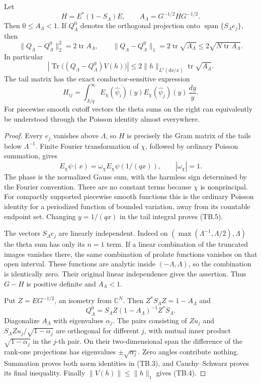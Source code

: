 \begin{proposition}
\label{AC-T22}
Let
\[
 H=E^*(1-S_\Lambda)E,\qquad
 A_\Lambda=G^{-1/2}HG^{-1/2}.
\]
Then \(0\leq A_\Lambda<1\).
If \(Q_\Lambda^0\) denotes the orthogonal projection onto
\(\operatorname{span}\{S_\Lambda e_j\}\), then
\[
 \|Q_\Lambda-Q_\Lambda^0\|_2^2
       =2\operatorname{tr}A_\Lambda,\qquad
 \|Q_\Lambda-Q_\Lambda^0\|_1
       =2\operatorname{tr}\sqrt{A_\Lambda}
       \leq2\sqrt{N\operatorname{tr}A_\Lambda}.
 \tag{TB.3}
\]
In particular
\[
 \left|\operatorname{Tr}\bigl((Q_\Lambda-Q_\Lambda^0)V(h)\bigr)\right|
       \leq 2\|h\|_{L^1(dx/x)}
                     \operatorname{tr}\sqrt{A_\Lambda}.
 \tag{TB.4}
\]
The tail matrix has the exact conductor-sensitive expression
\[
 H_{ij}=\int_{\Lambda/q}^\infty
   \overline{E_{\overline\chi}(\widehat\psi_i)(y)}
             E_{\overline\chi}(\widehat\psi_j)(y)\,\frac{dy}{y}.
 \tag{TB.5}
\]
For piecewise smooth cutoff vectors the theta sums on the
right can equivalently be understood through the Poisson
identity almost everywhere.
\end{proposition}
\begin{proof}
Every \(e_j\) vanishes above \(\Lambda\), so \(H\) is
precisely the Gram matrix of the tails below \(\Lambda^{-1}\).
Finite Fourier transformation of \(\chi\), followed by ordinary
Poisson summation, gives
\[
 E_\chi\psi(x)=\omega_\chi
       E_{\overline\chi}\widehat\psi(1/(qx)),
 \qquad |\omega_\chi|=1.
 \tag{TB.6}
\]
The phase is the normalized Gauss sum, with the harmless
sign determined by the Fourier convention.  There are no
constant terms because \(\chi\) is nonprincipal.
For compactly supported piecewise smooth functions this is
the ordinary Poisson identity for a periodized function of
bounded variation, away from its countable endpoint set.
Changing \(y=1/(qx)\) in the tail integral proves (TB.5).

The vectors \(S_\Lambda e_j\) are linearly independent.
Indeed on
\((\max(\Lambda^{-1},\Lambda/2),\Lambda)\) the theta sum
has only its \(n=1\) term.  If a linear combination of the
truncated images vanishes there, the same combination of
prolate functions vanishes on that open interval.
These functions are analytic inside \((-\Lambda,\Lambda)\),
so the combination is identically zero.  Their original
linear independence gives the assertion.
Thus \(G-H\) is positive definite and \(A_\Lambda<1\).

Put \(Z=EG^{-1/2}\), an isometry from \(\mathbb C^N\).
Then \(Z^*S_\Lambda Z=1-A_\Lambda\) and
\[
 Q_\Lambda^0=S_\Lambda Z(1-A_\Lambda)^{-1}Z^*S_\Lambda.
\]
Diagonalize \(A_\Lambda\) with eigenvalues \(\alpha_j\).
The pairs consisting of \(Z u_j\) and
\(S_\Lambda Zu_j/\sqrt{1-\alpha_j}\) are orthogonal for
different \(j\), with mutual inner product
\(\sqrt{1-\alpha_j}\) in the \(j\)-th pair.
On their two-dimensional span the difference of the
rank-one projections has eigenvalues
\(\pm\sqrt{\alpha_j}\).  Zero angles contribute nothing.
Summation proves both norm identities in (TB.3), and
Cauchy--Schwarz proves its final inequality.
Finally \(\|V(h)\|\leq\|h\|_1\) gives (TB.4).
\end{proof}

